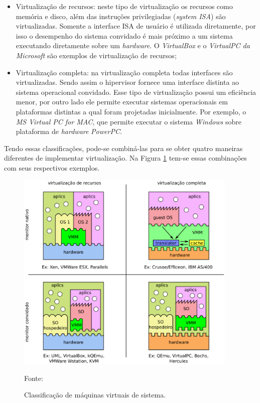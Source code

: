 \begin{itemize}
 \item Virtualização de recursos: neste tipo de virtualização os recursos como memória e disco, além das instruções 
 privilegiadas (\textit{system \ac{ISA}}) são virtualizadas. Somente a interface \ac{ISA} de usuário é utilizada diretamente, 
 por isso o desempenho do sistema convidado é mais próximo a um sistema executando diretamente sobre um \textit{hardware}. O 
 \textit{VirtualBox} e o \textit{VirtualPC da Microsoft} são exemplos de virtualização de recursos;
 \item Virtualização completa: na virtualização completa todas interfaces são virtualizadas. Sendo assim o hipervisor fornece uma
 interface distinta ao sistema operacional convidado. Esse tipo de virtualização possui um eficiência menor, por outro lado ele
 permite executar sistemas operacionais em plataformas distintas a qual foram projetadas inicialmente. Por exemplo, o 
 \textit{MS Virtual PC for MAC}, que permite executar o sistema \textit{Windows} sobre plataforma de \textit{hardware} \textit{PowerPC}.
\end{itemize}

Tendo essas classificações, pode-se combiná-las para se obter quatro maneiras diferentes de implementar virtualização. Na Figura 
\ref{fig:vms_classificacao} tem-se essas combinações com seus respectivos exemplos.

\begin{figure}[vms_classificacao]
 \centering
 \includegraphics[width=400px]{img/vms_classificacao.eps}
 \caption{Classificação de máquinas virtuais de sistema.}
 \label{fig:vms_classificacao}
 Fonte: \citet{laureano2008}
\end{figure}

